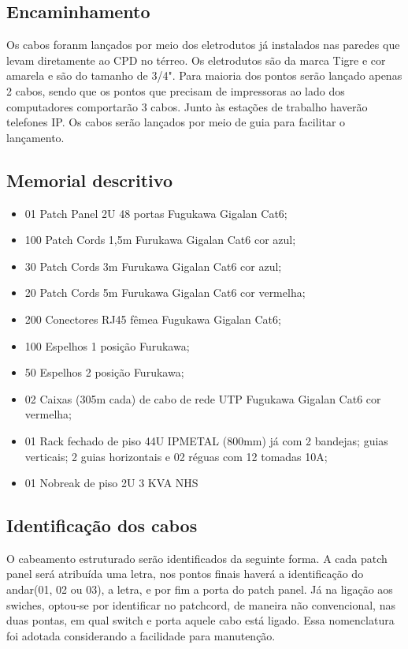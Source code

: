 \documentclass[	DIV=calc,%
							paper=a4,%
							fontsize=12pt,%
							onecolumn]{scrartcl}	 					%
\begin{document}
\subsection{Encaminhamento}
Os cabos foranm lançados por meio dos eletrodutos já instalados nas paredes que levam diretamente ao CPD no térreo. Os eletrodutos são da marca Tigre e cor amarela e são do tamanho de 3/4". Para maioria dos pontos serão lançado apenas 2 cabos, sendo que os pontos que precisam de impressoras ao lado dos computadores comportarão 3 cabos. Junto às estações de trabalho haverão telefones IP. Os cabos serão lançados por meio de guia para facilitar o lançamento. 

\subsection{Memorial descritivo}

\begin{itemize}

\item 01	Patch Panel 2U 48 portas Fugukawa Gigalan Cat6;
\item 100	Patch Cords 1,5m Furukawa Gigalan Cat6 cor azul;
\item 30	Patch Cords 3m Furukawa Gigalan Cat6 cor azul;
\item 20	Patch Cords 5m Furukawa Gigalan Cat6 cor vermelha;
\item 200	Conectores RJ45 fêmea Fugukawa Gigalan Cat6;
\item 100 	Espelhos 1 posição Furukawa;
\item 50 	Espelhos 2 posição Furukawa;
\item 02	Caixas (305m cada) de cabo de rede UTP Fugukawa Gigalan Cat6 cor vermelha;
\item 01 	Rack fechado de piso 44U IPMETAL (800mm) já com 2 bandejas; guias verticais; 2 guias horizontais e 02 réguas com 12 tomadas 10A;
\item 01	Nobreak de piso 2U 3 KVA NHS 
\end{itemize}

\subsection{Identificação dos cabos}
O cabeamento estruturado serão identificados da seguinte forma. A cada patch panel será atribuída uma letra, nos pontos finais haverá a identificação do andar(01, 02 ou 03), a letra, e por fim a porta do patch panel. Já na ligação aos swiches, optou-se por identificar no patchcord, de maneira não convencional, nas duas pontas, em qual switch e porta aquele cabo está ligado. Essa nomenclatura foi adotada considerando a facilidade para manutenção.
\end{document}
